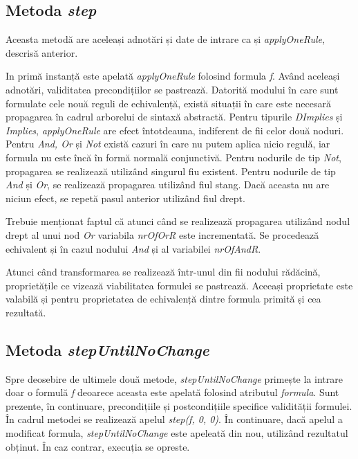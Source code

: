 \subsection{Metoda \textit{step}}

Aceasta metodă are aceleași adnotări și date de intrare ca și \textit{applyOneRule}, descrisă anterior. 

In primă instanță este apelată \textit{applyOneRule} folosind formula \textit{f}. Având aceleași adnotări, validitatea precondițiilor se pastrează. Datorită modului în care sunt formulate cele nouă reguli de echivalență, există situații în care este necesară propagarea în cadrul arborelui de sintaxă abstractă. Pentru tipurile \textit{DImplies} și \textit{Implies}, \textit{applyOneRule} are efect întotdeauna, indiferent de fii celor două noduri. Pentru \textit{And, Or} și \textit{Not} există cazuri în care nu putem aplica nicio regulă, iar formula nu este încă în formă normală conjunctivă. Pentru nodurile de tip \textit{Not}, propagarea se realizează utilizând singurul fiu existent. Pentru nodurile de tip \textit{And} și \textit{Or}, se realizează propagarea utilizând fiul stang. Dacă aceasta nu are niciun efect, se repetă pasul anterior utilizând fiul drept. 

Trebuie menționat faptul că atunci când se realizează propagarea utilizând nodul drept al unui nod \textit{Or} variabila \textit{nrOfOrR} este incrementată. Se procedează echivalent și în cazul nodului \textit{And} și al variabilei \textit{nrOfAndR}.

Atunci când transformarea se realizează într-unul din fii nodului rădăcină, proprietățile ce vizează viabilitatea formulei se pastrează. Aceeași proprietate este valabilă și pentru proprietatea de echivalență dintre formula primită și cea rezultată. 

\subsection{Metoda \textit{stepUntilNoChange}}

Spre deosebire de ultimele două metode, \textit{stepUntilNoChange} primește la intrare doar o formulă \textit{f} deoarece aceasta este apelată folosind atributul \textit{formula}. Sunt prezente, în continuare, precondițiile și postcondițiile specifice validității formulei. În cadrul metodei se realizează apelul \textit{step(f, 0, 0)}. În continuare, dacă apelul a modificat formula, \textit{stepUntilNoChange} este apeleată din nou, utilizând rezultatul obținut. În caz contrar, execuția se opreste. 

